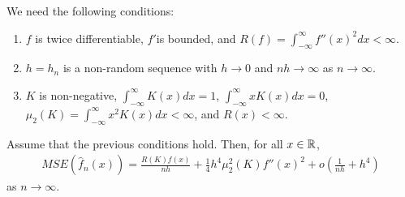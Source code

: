 We need the following conditions:
\begin{enumerate}
\item \label{item:4} $f$ is twice differentiable, $f'$is bounded, and $R(f) =
  \int_{-\infty}^{\infty} f''(x)^{2} dx < \infty$.
\item \label{item:5} $h = h_{n}$ is a non-random sequence with $h \rightarrow 0$ and
  $nh \rightarrow \infty$ as $n \rightarrow \infty$.
\item \label{item:6} $K$ is non-negative, $\int_{-\infty}^{\infty} K(x) dx = 1$,
  $\int_{-\infty}^{\infty} x K(x) dx = 0$, $\mu_{2}(K) =
  \int_{-\infty}^{\infty} x^{2} K(x) dx < \infty$, and $R(x) < \infty$.
\end{enumerate}

\begin{thm}
  \label{defn:Introduction:3}
  Assume that the previous conditions hold. Then, for all $x \in \mathbb{R}$,
  \begin{align}
    \label{eq:15}
    MSE(\hat f_{n}(x)) = \frac{R(K) f(x)}{nh} + \frac{1}{4} h^{4}
    \mu_{2}^{2}(K) f''(x)^{2} + o(\frac{1}{nh} + h^{4})
  \end{align} as $n \rightarrow \infty$.
\end{thm}

